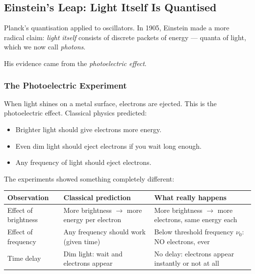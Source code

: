 \documentclass[12pt, a4paper]{book}
\newcommand{\newterm}[1]{\textit{\textcolor{DiscoveryColor}{#1}}}
\begin{document}
\subsection{Einstein's Leap: Light Itself Is Quantised}

Planck's quantisation applied to oscillators.
In 1905, Einstein made a more radical claim:
\emph{light itself} consists of discrete packets of energy ---
quanta of light, which we now call \newterm{photons}.

His evidence came from the \newterm{photoelectric effect}.

\subsubsection{The Photoelectric Experiment}

When light shines on a metal surface, electrons are ejected.
This is the photoelectric effect.
Classical physics predicted:

\begin{itemize}[leftmargin=2em, nosep]
  \item Brighter light should give electrons more energy.
  \item Even dim light should eject electrons if you wait long enough.
  \item Any frequency of light should eject electrons.
\end{itemize}

The experiments showed something completely different:

\begin{center}
\begin{tabular}{p{5cm} p{4.5cm} p{4.5cm}}
\toprule
\textbf{Observation} & \textbf{Classical prediction} & \textbf{What really happens} \\
\midrule
Effect of brightness &
  More brightness $\to$ more energy per electron &
  More brightness $\to$ more electrons, same energy each \\[6pt]
Effect of frequency &
  Any frequency should work (given time) &
  Below threshold frequency $\nu_0$: NO electrons, ever \\[6pt]
Time delay &
  Dim light: wait and electrons appear &
  No delay: electrons appear instantly or not at all \\
\bottomrule
\end{tabular}
\end{center}
\end{document}
